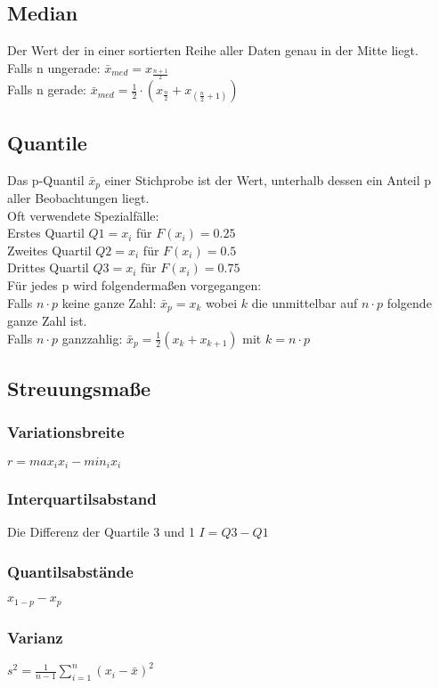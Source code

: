 \documentclass[a4paper, 11pt]{article}
\begin{document}
\subsection{Median} Der Wert der in einer sortierten Reihe aller Daten genau in
der Mitte liegt. \\
Falls n ungerade: $\bar{x}_{med} = x_{\frac{n+1}{2}}$ \\
Falls n gerade: $\bar{x}_{med} = \frac{1}{2} \cdot (x_{\frac{n}{2}} +
x_{(\frac{n}{2} + 1)})$ \\ 
\subsection{Quantile}
Das p-Quantil $\bar{x}_p$ einer Stichprobe ist der Wert, unterhalb dessen ein
Anteil p aller Beobachtungen liegt. \\
Oft verwendete Spezialfälle: \\
Erstes Quartil $Q1 = x_i$ für $F(x_i) = 0.25$ \\
Zweites Quartil $Q2 = x_i$ für $F(x_i) = 0.5$ \\
Drittes Quartil $Q3 = x_i$ für $F(x_i) = 0.75$ \\
\newline
Für jedes p wird folgendermaßen vorgegangen: \\
Falls $n\cdot p$ keine ganze Zahl: $\bar{x}_p = x_k$ wobei $k$ die
unmittelbar auf $n\cdot p$ folgende ganze Zahl ist. \\
Falls $n\cdot p$ ganzzahlig: $\bar{x}_p = \frac{1}{2}(x_k+x_{k+1})$ mit $k =
n\cdot p$ \\
\subsection{Streuungsmaße}
\subsubsection{Variationsbreite}
$r=max_ix_i - min_ix_i$
\subsubsection{Interquartilsabstand}
Die Differenz der Quartile 3 und 1 $I = Q3-Q1$
\subsubsection{Quantilsabstände}
$x_{1-p}-x_p$
\subsubsection{Varianz}
$s^2 = \frac{1}{n-1} \sum\nolimits_{i=1}^{n}(x_i-\bar{x})^2$
\end{document}
